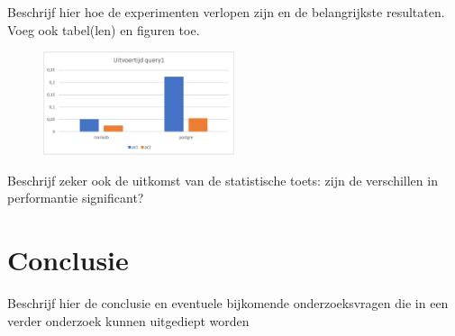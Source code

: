 \documentclass[fleqn,10pt]{artikeltin}
\begin{document}
Beschrijf hier hoe de experimenten verlopen zijn en de belangrijkste resultaten. Voeg ook tabel(len) en figuren toe.

\begin{figure}
    \includegraphics[width=0.5\textwidth]{query1.png}
\end{figure}

Beschrijf zeker ook de uitkomst van de statistische toets: zijn de verschillen in performantie significant?

\section{Conclusie}
\label{sec:conclusie}

Beschrijf hier de conclusie en eventuele bijkomende onderzoeksvragen die in een verder onderzoek kunnen uitgediept worden


\printbibliography[heading=bibintoc]
\end{document}
